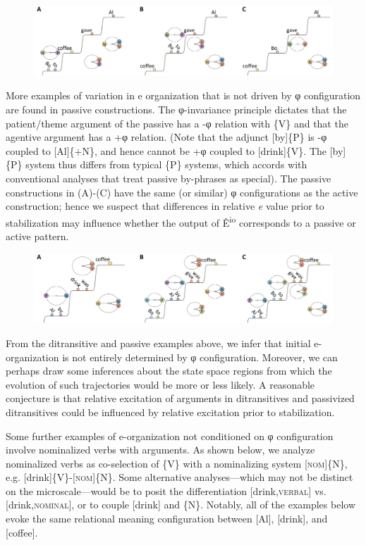   
\begin{figure}
\includegraphics[width=\textwidth]{figures/Tilsen-img80.png}
\caption{\missingcaption}
\label{fig:}
\end{figure}
 

  More examples of variation in e organization that is not driven by φ configuration are found in passive constructions. The φ-invariance principle dictates that the patient/theme argument of the passive has a -φ relation with \{V\} and that the agentive argument has a +φ relation. (Note that the adjunct [by]\{P\} is -φ coupled to [Al]\{+N\}, and hence cannot be +φ coupled to [drink]\{V\}. The [by]\{P\} system thus differs from typical \{P\} systems, which accords with conventional analyses that treat passive by-phrases as special). The passive constructions in (A)-(C) have the same (or similar) φ configurations as the active construction; hence we suspect that differences in relative \textit{e} value prior to stabilization may influence whether the output of Ê\textsuperscript{io} corresponds to a passive or active pattern.

  
\begin{figure}
\includegraphics[width=\textwidth]{figures/Tilsen-img81.png}
\caption{\missingcaption}
\label{fig:}
\end{figure}
 

  From the ditransitive and passive examples above, we infer that initial e-organization is not entirely determined by φ configuration. Moreover, we can perhaps draw some inferences about the state space regions from which the evolution of such trajectories would be more or less likely. A reasonable conjecture is that relative excitation of arguments in ditransitives and passivized ditransitives could be influenced by relative excitation prior to stabilization.

  Some further examples of e-organization not conditioned on φ configuration involve nominalized verbs with arguments. As shown below, we analyze nominalized verbs as co-selection of \{V\} with a nominalizing system [\textsc{nom}]\{N\}, e.g. [drink]\{V\}-[\textsc{nom}]\{\textsc{N}\}. Some alternative analyses—which may not be distinct on the microscale—would be to posit the differentiation [drink,\textsc{verbal}] vs. [drink,\textsc{nominal}], or to couple [drink] and \{N\}. Notably, all of the examples below evoke the same relational meaning configuration between [Al], [drink], and [coffee].

